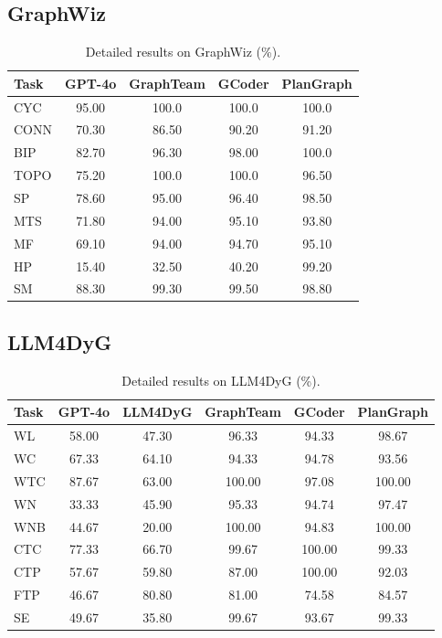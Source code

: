 \documentclass[sigconf,review,anonymous]{acmart}
\begin{document}
\subsection{GraphWiz}
\begin{table}[H]
\centering
\caption{Detailed results on GraphWiz (\%).}
\begin{tabular}{lcccc}
\toprule
Task & GPT-4o & GraphTeam & GCoder & PlanGraph \\
\midrule
CYC & 95.00 & 100.0 & 100.0 & 100.0 \\
CONN & 70.30 & 86.50 & 90.20 & 91.20 \\
BIP & 82.70 & 96.30 & 98.00 & 100.0 \\
TOPO & 75.20 & 100.0 & 100.0 & 96.50 \\
SP & 78.60 & 95.00 & 96.40 & 98.50 \\
MTS & 71.80 & 94.00 & 95.10 & 93.80 \\
MF & 69.10 & 94.00 & 94.70 & 95.10 \\
HP & 15.40 & 32.50 & 40.20 & 99.20 \\
SM & 88.30 & 99.30 & 99.50 & 98.80 \\
\bottomrule
\end{tabular}
\end{table}

\subsection{LLM4DyG}

\begin{table}[H]
\centering
\small
\caption{Detailed results on LLM4DyG (\%).}
\begin{tabular}{lccccc}
\toprule
Task & GPT-4o & LLM4DyG & GraphTeam & GCoder & PlanGraph \\
\midrule
WL & 58.00 & 47.30 & 96.33 & 94.33 & 98.67 \\
WC & 67.33 & 64.10 & 94.33 & 94.78 & 93.56 \\
WTC & 87.67 & 63.00 & 100.00 & 97.08 & 100.00 \\
WN & 33.33 & 45.90 & 95.33 & 94.74 & 97.47 \\
WNB & 44.67 & 20.00 & 100.00 & 94.83 & 100.00 \\
CTC & 77.33 & 66.70 & 99.67 & 100.00 & 99.33 \\
CTP & 57.67 & 59.80 & 87.00 & 100.00 & 92.03 \\
FTP & 46.67 & 80.80 & 81.00 & 74.58 & 84.57 \\
SE & 49.67 & 35.80 & 99.67 & 93.67 & 99.33 \\
\bottomrule
\end{tabular}
\end{table}
\end{document}
